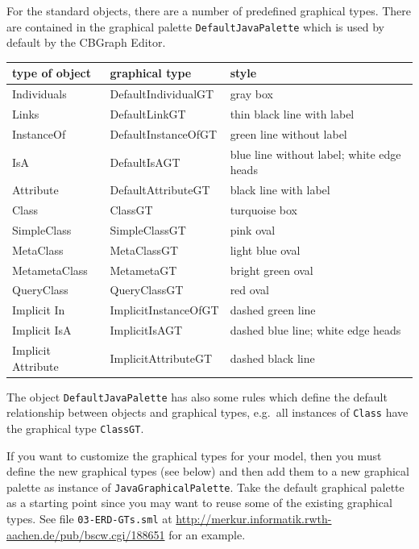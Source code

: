 For the standard objects, there are a number of predefined graphical
types. There are contained in the graphical palette {\tt DefaultJavaPalette}
which is used by default by the CBGraph Editor.

\begin{center}
\begin{tabular}{|l|l|l|} \hline
{\bf type of object} & {\bf graphical type} & {\bf style} \\ \hline \hline
Individuals & DefaultIndividualGT & gray box \\ \hline
Links & DefaultLinkGT & thin black line with label\\ \hline
InstanceOf & DefaultInstanceOfGT & green line without label \\ \hline
IsA & DefaultIsAGT & blue line without label; white edge heads \\ \hline
Attribute & DefaultAttributeGT & black line with label\\ \hline
Class & ClassGT & turquoise box\\ \hline
SimpleClass & SimpleClassGT & pink oval\\ \hline
MetaClass & MetaClassGT & light blue oval\\ \hline
MetametaClass & MetametaGT & bright green oval\\ \hline
QueryClass & QueryClassGT & red oval\\ \hline
Implicit In & ImplicitInstanceOfGT & dashed green line\\ \hline
Implicit IsA & ImplicitIsAGT & dashed blue line; white edge heads\\ \hline
Implicit Attribute & ImplicitAttributeGT & dashed black line \\ \hline
\end{tabular}
\end{center}

The object {\tt DefaultJavaPalette} has also some rules which define
the default relationship between objects and graphical types, e.g.\
all instances of {\tt Class} have the graphical type {\tt ClassGT}.

If you want to customize the graphical types for your model, then
you must define the new graphical types (see below) and then add
them to a new graphical palette as instance of {\tt JavaGraphicalPalette}.
Take the default graphical palette
as a starting point since you may want to reuse some of the existing
graphical types. See file {\tt 03-ERD-GTs.sml} at
\url{http://merkur.informatik.rwth-aachen.de/pub/bscw.cgi/188651}
for an example.

